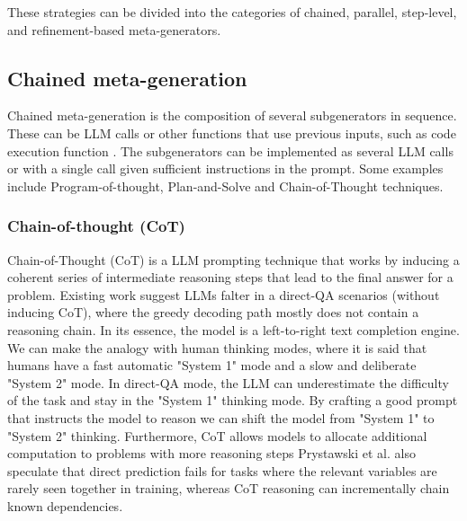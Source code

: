 These strategies can be divided into the categories of chained, parallel, step-level, and refinement-based meta-generators\cite{welleck2024decodingmetagenerationinferencetimealgorithms}.

\subsection{Chained meta-generation}

Chained meta-generation is the composition of several subgenerators in sequence. 
These can be LLM calls or other functions that use previous inputs, such as code execution function .
The subgenerators can be implemented as several LLM calls or with a single call given sufficient instructions in the prompt. \cite{khattab2023dspycompilingdeclarativelanguage}
Some examples include Program-of-thought, Plan-and-Solve and Chain-of-Thought techniques.

\subsubsection{Chain-of-thought (CoT)}
Chain-of-Thought (CoT) is a LLM prompting technique that works by inducing a coherent series of intermediate 
reasoning steps that lead to the final answer for a problem\cite{wei2023chainofthoughtpromptingelicitsreasoning}.
Existing work suggest LLMs falter in a direct-QA scenarios (without inducing CoT), where the greedy decoding path mostly does not contain a reasoning chain\cite{wang2024chainofthoughtreasoningprompting}. 
In its essence, the model is a left-to-right text completion engine. We can make the analogy with human thinking 
modes, where it is said that humans have a fast automatic "System 1" mode and a slow and deliberate "System 2" mode\cite{yao2023treethoughtsdeliberateproblem}. 
In direct-QA mode, the LLM can underestimate the difficulty of the task\cite{wang2024chainofthoughtreasoningprompting} and stay in the "System 1" thinking mode.
By crafting a good prompt that instructs the model to reason we can shift the model from "System 1" to "System 2" thinking.
Furthermore, CoT allows models to allocate additional computation to problems with more reasoning steps\cite{wei2023chainofthoughtpromptingelicitsreasoning}
Prystawski et al.\cite{prystawski2023thinkstepstepreasoning} also speculate that direct prediction fails for tasks where
the relevant variables are rarely seen together in training, whereas CoT reasoning can incrementally chain known dependencies. 


